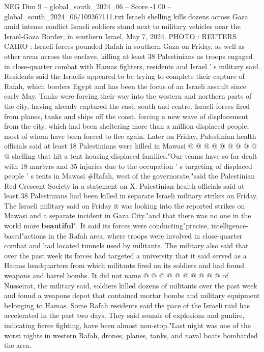 \begin{textsample}{NEG Dim 9 – global\_south\_2024\_06 – Score -1.00 – global\_south\_2024\_06/109367111.txt}  \label{ex:f9_neg_399}
Israeli shelling kills dozens across Gaza amid intense conflict Israeli soldiers stand next to military vehicles near the Israel-Gaza Border, in southern Israel, May 7, 2024.
PHOTO : REUTERS CAIRO : Israeli forces pounded Rafah in southern Gaza on Friday, as well as other areas across the enclave, killing at least 38 Palestinians as troops engaged in close-quarter combat with Hamas fighters, residents and Israel ' s military said.
Residents said the Israelis appeared to be trying to complete their capture of Rafah, which borders Egypt and has been the focus of an Israeli assault since early May.
Tanks were forcing their way into the western and northern parts of the city, having already captured the east, south and centre.
Israeli forces fired from planes, tanks and ships off the coast, forcing a new wave of displacement from the city, which had been sheltering more than a million displaced people, most of whom have been forced to flee again.
Later on Friday, Palestinian health officials said at least 18 Palestinians were killed in Mawasi @ @ @ @ @ @ @ @ @ @ shelling that hit a tent housing displaced families."Our teams have so far dealt with 18 martyrs and 35 injuries due to the occupation ' s targeting of displaced people ' s tents in Mawasi \#Rafah, west of the governorate,"said the Palestinian Red Crescent Society in a statement on X.
Palestinian health officials said at least 38 Palestinians had been killed in separate Israeli military strikes on Friday.
The Israeli military said on Friday it was looking into the reported strikes on Mawasi and a separate incident in Gaza City."and that there was no one in the world more \textbf{beautiful}".
It said its forces were conducting"precise, intelligence-based"actions in the Rafah area, where troops were involved in close-quarter combat and had located tunnels used by militants.
The military also said that over the past week its forces had targeted a university that it said served as a Hamas headquarters from which militants fired on its soldiers and had found weapons and barrel bombs.
It did not name @ @ @ @ @ @ @ @ @ @ of Nusseirat, the military said, soldiers killed dozens of militants over the past week and found a weapons depot that contained mortar bombs and military equipment belonging to Hamas.
Some Rafah residents said the pace of the Israeli raid has accelerated in the past two days.
They said sounds of explosions and gunfire, indicating fierce fighting, have been almost non-stop."Last night was one of the worst nights in western Rafah, drones, planes, tanks, and naval boats bombarded the area.

\end{textsample}
